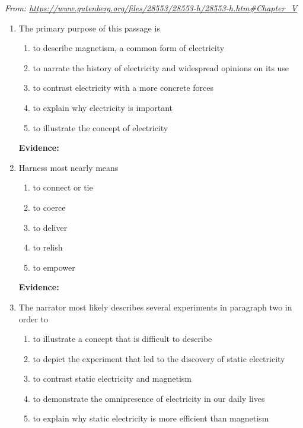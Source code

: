 \textit{From: \url{https://www.gutenberg.org/files/28553/28553-h/28553-h.htm\#Chapter\_V}}

\begin{enumerate}

\item The primary purpose of this passage is 

\bigskip
\begin{enumerate}[label=(\Alph*)]
\item to describe magnetism, a common form of electricity
\item to narrate the history of electricity and widespread opinions on its use
\item to contrast electricity with a more concrete forces
\item to explain why electricity is important
\item to illustrate the concept of electricity
\end{enumerate}

\bigskip
\textbf{Evidence:} \hrulefill

\item Harness most nearly means

\bigskip
\begin{enumerate}[label=(\Alph*)]
\item to connect or tie
\item to coerce
\item to deliver
\item to relish
\item to empower
\end{enumerate}

\bigskip
\textbf{Evidence:} \hrulefill

\item The narrator most likely describes several experiments in paragraph two in order to

\bigskip
\begin{enumerate}[label=(\Alph*)]
\item to illustrate a concept that is difficult to describe
\item to depict the experiment that led to the discovery of static electricity
\item to contrast static electricity and magnetism 
\item to demonstrate the omnipresence of electricity in our daily lives
\item to explain why static electricity is more efficient than magnetism 
\end{enumerate}


\end{enumerate}
